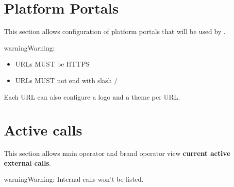 \documentclass[letterpaper,10pt,english]{sphinxmanual}
\begin{document}
\section{Platform Portals}
\label{administration_portal/platform/portals:portals}\label{administration_portal/platform/portals:platform-portals}\label{administration_portal/platform/portals::doc}
This section allows configuration of platform portals that will be used by {\hyperref[administration_portal/platform/main_operators:main\string-operators]{}}.

\begin{notice}{warning}{Warning:}\begin{itemize}
\item {} 
URLs MUST be HTTPS

\item {} 
URLs MUST not end with slash /

\end{itemize}
\end{notice}

Each URL can also configure a logo and a theme per URL.


\section{Active calls}
\label{administration_portal/platform/active_calls::doc}\label{administration_portal/platform/active_calls:active-calls}
This section allows main operator and brand operator view \textbf{current active external calls}.

\begin{notice}{warning}{Warning:}
Internal calls won't be listed.
\end{notice}
\end{document}
